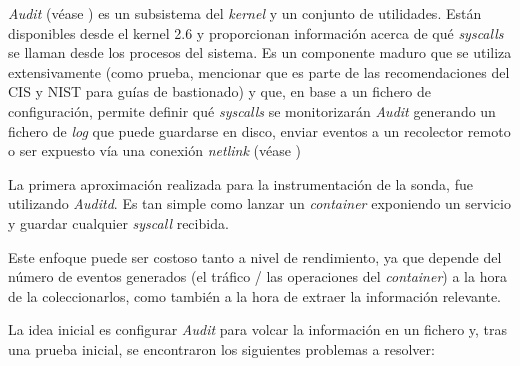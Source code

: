 \emph{Audit} (véase \cite{redhat-auditd}) es un subsistema del \emph{kernel} y un conjunto de utilidades. 
Están disponibles desde el kernel 2.6 y proporcionan información acerca de qué \emph{syscalls}
se llaman desde los procesos del sistema. 
Es un componente maduro que se utiliza extensivamente (como prueba, mencionar que es parte de las recomendaciones del CIS y NIST para guías de bastionado)
y que, en base a un fichero de configuración, permite definir qué \emph{syscalls} se monitorizarán
\emph{Audit} generando un fichero de \emph{log} que puede guardarse en disco, enviar eventos a un recolector remoto o ser expuesto vía una conexión
\emph{netlink} (véase \cite{wiki-netlink})

La primera aproximación realizada para la instrumentación de la sonda, fue utilizando \emph{Auditd}. Es tan simple como lanzar un \emph{container} exponiendo un servicio
y guardar cualquier \emph{syscall} recibida. 

Este enfoque puede ser costoso tanto a nivel de rendimiento, ya que depende del número de eventos generados (el tráfico / las operaciones del \emph{container}) a la hora de la coleccionarlos, como también
a la hora de extraer la información relevante.

La idea inicial es configurar \emph{Audit} para volcar la información en un fichero y, tras una prueba inicial, se encontraron los siguientes problemas a resolver:

